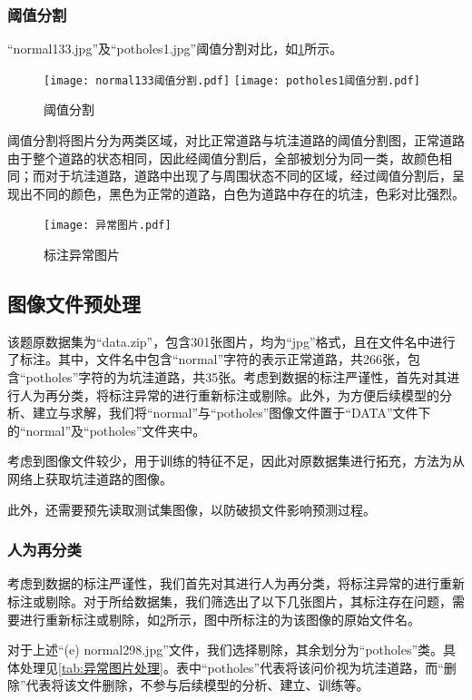 \documentclass{MathorCupmodeling}
\begin{document}
	\subsubsection{阈值分割}
	“normal133.jpg”及“potholes1.jpg”阈值分割对比，如\textcolor{blue}{\cref{fig:阈值分割}}所示。
	\begin{figure}[H]
		\centering
		\texttt{[image: normal133阈值分割.pdf]}
		\hspace{0.3in}
		\texttt{[image: potholes1阈值分割.pdf]}
		\caption{阈值分割}
		\label{fig:阈值分割}
	\end{figure}
	阈值分割将图片分为两类区域，对比正常道路与坑洼道路的阈值分割图，正常道路由于整个道路的状态相同，因此经阈值分割后，全部被划分为同一类，故颜色相同；而对于坑洼道路，道路中出现了与周围状态不同的区域，经过阈值分割后，呈现出不同的颜色，黑色为正常的道路，白色为道路中存在的坑洼，色彩对比强烈。
	\begin{figure}[H]
		\centering
		\texttt{[image: 异常图片.pdf]}
		\caption{标注异常图片}
		\label{fig:异常图片}
	\end{figure}
	\subsection{图像文件预处理}\label{图像文件预处理}
	该题原数据集为“data.zip”，包含301张图片，均为“jpg”格式，且在文件名中进行了标注。其中，文件名中包含“normal”字符的表示正常道路，共266张，包含“potholes”字符的为坑洼道路，共35张。考虑到数据的标注严谨性，首先对其进行人为再分类，将标注异常的进行重新标注或剔除。此外，为方便后续模型的分析、建立与求解，我们将“normal”与“potholes”图像文件置于“DATA”文件下的“normal”及“potholes”文件夹中。

	考虑到图像文件较少，用于训练的特征不足，因此对原数据集进行拓充，方法为从网络上获取坑洼道路的图像。

	此外，还需要预先读取测试集图像，以防破损文件影响预测过程。

	\subsubsection{人为再分类}
	考虑到数据的标注严谨性，我们首先对其进行人为再分类，将标注异常的进行重新标注或剔除。对于所给数据集，我们筛选出了以下几张图片，其标注存在问题，需要进行重新标注或剔除，如\textcolor{blue}{\cref{fig:异常图片}}所示，图中所标注的为该图像的原始文件名。

	对于上述“(e) normal298.jpg”文件，我们选择剔除，其余划分为“potholes”类。具体处理见\textcolor{blue}{\cref{tab:异常图片处理}}。表中“potholes”代表将该问价视为坑洼道路，而“删除”代表将该文件删除，不参与后续模型的分析、建立、训练等。
\end{document}
